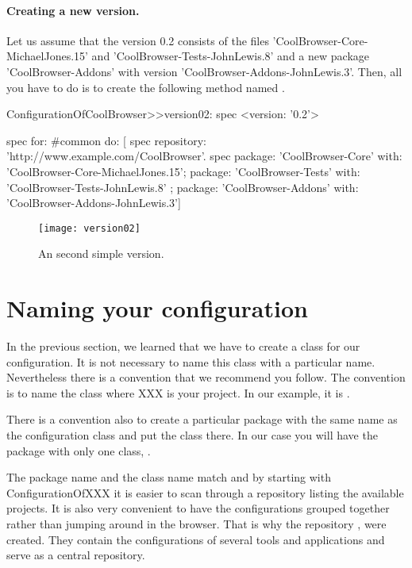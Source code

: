 \documentclass[a4paper,10pt,twoside]{book}
\begin{document}
\paragraph{Creating a new version.}
Let us assume that the version 0.2 consists of the files 'CoolBrowser-Core-MichaelJones.15' and 'CoolBrowser-Tests-JohnLewis.8' and a new package 'CoolBrowser-Addons' with version 'CoolBrowser-Addons-JohnLewis.3'. Then, all you have to do is to create the following method named .

\begin{code}{}
ConfigurationOfCoolBrowser>>version02: spec 
       <version: '0.2'>
       
       spec for: #common do: [
              spec repository: 'http://www.example.com/CoolBrowser'.
              spec 
                     package: 'CoolBrowser-Core' with: 'CoolBrowser-Core-MichaelJones.15';
                     package: 'CoolBrowser-Tests' with: 'CoolBrowser-Tests-JohnLewis.8' ;
                     package: 'CoolBrowser-Addons' with: 'CoolBrowser-Addons-JohnLewis.3']
\end{code}
 
\begin{figure}
\begin{center}
\texttt{[image: version02]}
\caption{An second simple version.}
\end{center}
\end{figure} 
 

\section{Naming your configuration}

In the previous section, we learned that we have to create a class for our configuration. It is not necessary to name this class with a particular name. Nevertheless there is a convention that we recommend you follow. The convention is to name the class  where XXX is your project. In our example, it is .

There is a convention also to create a particular package with the same name as the configuration class and put the class there. In our case you will have the package  with only one class, . 

The package name and the class name match and by starting with ConfigurationOfXXX it is easier to scan through a repository listing the available projects. It is also very convenient to have the configurations grouped together rather than jumping around in the browser. That is why the repository ,  were created. They contain the configurations of several tools and applications and serve as a central repository. 
\end{document}
